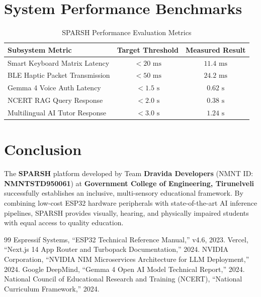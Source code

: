 \documentclass[12pt,a4paper]{report}
\begin{document}
\section{System Performance Benchmarks}
\begin{table}[htbp]
    \centering
    \caption{SPARSH Performance Evaluation Metrics}
    \vspace{0.2cm}
    \renewcommand{\arraystretch}{1.2}
    \begin{tabular}{|l|c|c|}
        \hline
        \textbf{Subsystem Metric} & \textbf{Target Threshold} & \textbf{Measured Result} \\ \hline
        Smart Keyboard Matrix Latency & $< 20 \text{ ms}$ & $11.4 \text{ ms}$ \\ \hline
        BLE Haptic Packet Transmission & $< 50 \text{ ms}$ & $24.2 \text{ ms}$ \\ \hline
        Gemma 4 Voice Auth Latency & $< 1.5 \text{ s}$ & $0.62 \text{ s}$ \\ \hline
        NCERT RAG Query Response & $< 2.0 \text{ s}$ & $0.38 \text{ s}$ \\ \hline
        Multilingual AI Tutor Response & $< 3.0 \text{ s}$ & $1.24 \text{ s}$ \\ \hline
    \end{tabular}
\end{table}

\section{Conclusion}
The \textbf{SPARSH} platform developed by Team \textbf{Dravida Developers} (NMNT ID: \textbf{NMNTSTD950061}) at \textbf{Government College of Engineering, Tirunelveli} successfully establishes an inclusive, multi-sensory educational framework. By combining low-cost ESP32 hardware peripherals with state-of-the-art AI inference pipelines, SPARSH provides visually, hearing, and physically impaired students with equal access to quality education.

\clearpage
\begin{thebibliography}{99}
 Espressif Systems, ``ESP32 Technical Reference Manual,'' v4.6, 2023.
 Vercel, ``Next.js 14 App Router and Turbopack Documentation,'' 2024.
 NVIDIA Corporation, ``NVIDIA NIM Microservices Architecture for LLM Deployment,'' 2024.
 Google DeepMind, ``Gemma 4 Open AI Model Technical Report,'' 2024.
 National Council of Educational Research and Training (NCERT), ``National Curriculum Framework,'' 2024.
\end{thebibliography}
\end{document}
